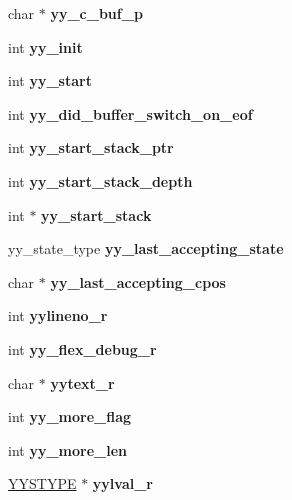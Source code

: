 \begin{DoxyCompactItemize}
char $\ast$ {\bfseries yy\+\_\+c\+\_\+buf\+\_\+p}
\item 
\mbox{\label{structyyguts__t_aeae6dabf9dcc4769518ecf054181b1c8}} 
int {\bfseries yy\+\_\+init}
\item 
\mbox{\label{structyyguts__t_a2e1e1d9ee4610a6679d49ed8194b00af}} 
int {\bfseries yy\+\_\+start}
\item 
\mbox{\label{structyyguts__t_a57edb4569f96dcfce9deaff0eb6a6412}} 
int {\bfseries yy\+\_\+did\+\_\+buffer\+\_\+switch\+\_\+on\+\_\+eof}
\item 
\mbox{\label{structyyguts__t_a34dbf3316e47b7ec6bdc203e4ee87d4d}} 
int {\bfseries yy\+\_\+start\+\_\+stack\+\_\+ptr}
\item 
\mbox{\label{structyyguts__t_abc3da050f523ea26b13d241f83ab6540}} 
int {\bfseries yy\+\_\+start\+\_\+stack\+\_\+depth}
\item 
\mbox{\label{structyyguts__t_a5bcfc454dba790d184c36415bb5dc254}} 
int $\ast$ {\bfseries yy\+\_\+start\+\_\+stack}
\item 
\mbox{\label{structyyguts__t_a1e8856234732c99be24858b0073e1297}} 
yy\+\_\+state\+\_\+type {\bfseries yy\+\_\+last\+\_\+accepting\+\_\+state}
\item 
\mbox{\label{structyyguts__t_afc6bef71feb2394eb5291e710139dfb3}} 
char $\ast$ {\bfseries yy\+\_\+last\+\_\+accepting\+\_\+cpos}
\item 
\mbox{\label{structyyguts__t_ae8c340b82a1c079ec8135ccbf74c228e}} 
int {\bfseries yylineno\+\_\+r}
\item 
\mbox{\label{structyyguts__t_a9027c888955749f1723ff2f9fdf6cfff}} 
int {\bfseries yy\+\_\+flex\+\_\+debug\+\_\+r}
\item 
\mbox{\label{structyyguts__t_a8ac4a09c9452a1b63c921947650e9d90}} 
char $\ast$ {\bfseries yytext\+\_\+r}
\item 
\mbox{\label{structyyguts__t_a6129ee9fdda293cab1800b69a9d89871}} 
int {\bfseries yy\+\_\+more\+\_\+flag}
\item 
\mbox{\label{structyyguts__t_a4bdb55a62cfaaf9a9d47fc08f2afc526}} 
int {\bfseries yy\+\_\+more\+\_\+len}
\item 
\mbox{\label{structyyguts__t_a16bf3f8f6f693ccbd0526af1b96e3f04}} 
\hyperlink{union_y_y_s_t_y_p_e}{Y\+Y\+S\+T\+Y\+PE} $\ast$ {\bfseries yylval\+\_\+r}
\end{DoxyCompactItemize}


